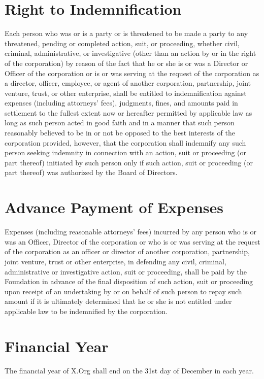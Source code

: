 \documentclass[10pt, english]{bylaws}
\begin{document}
\section{Right to Indemnification}
Each person who was or is a party or is threatened to be made a party to any
threatened, pending or completed action, suit, or proceeding, whether civil,
criminal, administrative, or investigative (other than an action by or in the
right of the corporation) by reason of the fact that he or she is or was a
Director or Officer of the corporation or is or was serving at the request of
the corporation as a director, officer, employee, or agent of another
corporation, partnership, joint venture, trust, or other enterprise, shall be
entitled to indemnification against expenses (including attorneys' fees),
judgments, fines, and amounts paid in settlement to the fullest extent now or
hereafter permitted by applicable law as long as such person acted in good faith
and in a manner that such person reasonably believed to be in or not be opposed
to the best interests of the corporation provided, however, that the corporation
shall indemnify any such person seeking indemnity in connection with an action,
suit or proceeding (or part thereof) initiated by such person only if such
action, suit or proceeding (or part thereof) was authorized by the Board of
Directors.

\section{Advance Payment of Expenses}
Expenses (including reasonable attorneys' fees) incurred by any person who is or
was an Officer, Director of the corporation or who is or was serving at the
request of the corporation as an officer or director of another corporation,
partnership, joint venture, trust or other enterprise, in defending any civil,
criminal, administrative or investigative action, suit or proceeding, shall be
paid by the Foundation in advance of the final disposition of such action, suit
or proceeding upon receipt of an undertaking by or on behalf of such person to
repay such amount if it is ultimately determined that he or she is not entitled
under applicable law to be indemnified by the corporation.


\section{Financial Year}
The financial year of X.Org shall end on the 31st day of December in each year.
\end{document}
